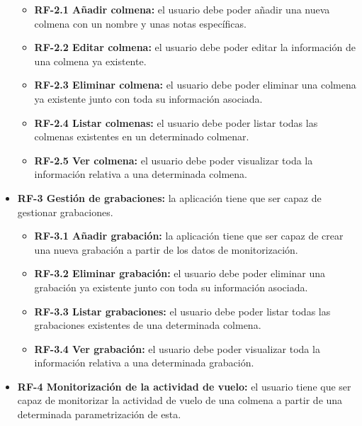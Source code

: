 \begin{itemize}
  \begin{itemize}
  \tightlist
  \item
    \textbf{RF-2.1 Añadir colmena:} el usuario debe poder añadir una
    nueva colmena con un nombre y unas notas específicas.
  \item
    \textbf{RF-2.2 Editar colmena:} el usuario debe poder editar la
    información de una colmena ya existente.
  \item
    \textbf{RF-2.3 Eliminar colmena:} el usuario debe poder eliminar una
    colmena ya existente junto con toda su información asociada.
  \item
    \textbf{RF-2.4 Listar colmenas:} el usuario debe poder listar todas
    las colmenas existentes en un determinado colmenar.
  \item
    \textbf{RF-2.5 Ver colmena:} el usuario debe poder visualizar toda
    la información relativa a una determinada colmena.
  \end{itemize}
\item
  \textbf{RF-3 Gestión de grabaciones:} la aplicación tiene que ser
  capaz de gestionar grabaciones.

  \begin{itemize}
  \tightlist
  \item
    \textbf{RF-3.1 Añadir grabación:} la aplicación tiene que ser capaz
    de crear una nueva grabación a partir de los datos de
    monitorización.
  \item
    \textbf{RF-3.2 Eliminar grabación:} el usuario debe poder eliminar
    una grabación ya existente junto con toda su información asociada.
  \item
    \textbf{RF-3.3 Listar grabaciones:} el usuario debe poder listar
    todas las grabaciones existentes de una determinada colmena.
  \item
    \textbf{RF-3.4 Ver grabación:} el usuario debe poder visualizar toda
    la información relativa a una determinada grabación.
  \end{itemize}
\item
  \textbf{RF-4 Monitorización de la actividad de vuelo:} el usuario
  tiene que ser capaz de monitorizar la actividad de vuelo de una
  colmena a partir de una determinada parametrización de esta.


\end{itemize}
